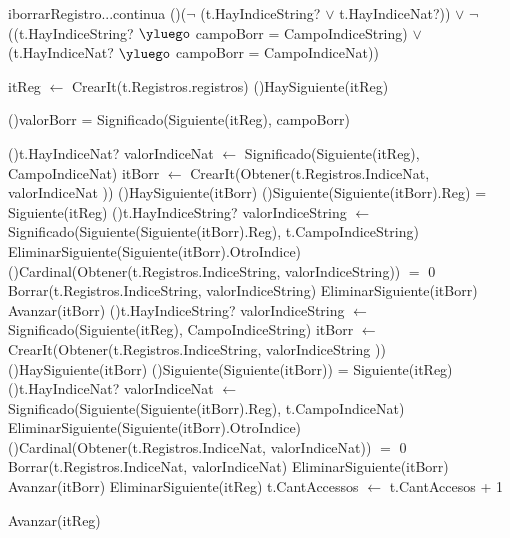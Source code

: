 \begin{Algoritmos}
\begin{algoritmo}{iborrarRegistro}{...continua}{}
    \If(){($\neg$ (t.HayIndiceString? $\vee$ t.HayIndiceNat?)) $\vee$ $\neg$ ((t.HayIndiceString? $\yluego$ campoBorr = CampoIndiceString) $\vee$ (t.HayIndiceNat? $\yluego$ campoBorr = CampoIndiceNat))}{
    itReg $\leftarrow$ CrearIt(t.Registros.registros) 
    \While(){HaySiguiente(itReg)}{
    	\If(){valorBorr = Significado(Siguiente(itReg), campoBorr)}{
        \If(){t.HayIndiceNat?}{
        valorIndiceNat $\gets$ Significado(Siguiente(itReg), CampoIndiceNat) 
        itBorr $\leftarrow$ CrearIt(Obtener(t.Registros.IndiceNat, valorIndiceNat )) 
        \While(){HaySiguiente(itBorr)}{
        \If(){Siguiente(Siguiente(itBorr).Reg) = Siguiente(itReg)}{
			\If(){t.HayIndiceString?}{
				valorIndiceString $\gets$ Significado(Siguiente(Siguiente(itBorr).Reg), t.CampoIndiceString) 
				EliminarSiguiente(Siguiente(itBorr).OtroIndice) 
				\If(){Cardinal(Obtener(t.Registros.IndiceString, valorIndiceString)) $=$ 0}{
                	Borrar(t.Registros.IndiceString, valorIndiceString)
               	}
            }
            EliminarSiguiente(itBorr) 
        }
        Avanzar(itBorr) 
        }
        }
        \If(){t.HayIndiceString?}{
        valorIndiceString $\gets$ Significado(Siguiente(itReg), CampoIndiceString) 
        itBorr $\leftarrow$ CrearIt(Obtener(t.Registros.IndiceString, valorIndiceString )) 
        \While(){HaySiguiente(itBorr)}{
        \If(){Siguiente(Siguiente(itBorr)) = Siguiente(itReg)}{
			\If(){t.HayIndiceNat?}{
				valorIndiceNat $\gets$ Significado(Siguiente(Siguiente(itBorr).Reg), t.CampoIndiceNat) 
				EliminarSiguiente(Siguiente(itBorr).OtroIndice) 
				\If(){Cardinal(Obtener(t.Registros.IndiceNat, valorIndiceNat)) $=$ 0}{
                	Borrar(t.Registros.IndiceNat, valorIndiceNat)
               	}
            }
        	EliminarSiguiente(itBorr) 
        }
        Avanzar(itBorr) 
        }
        }
        EliminarSiguiente(itReg) 
        t.CantAccessos $\leftarrow$ t.CantAccesos + 1 
        
        }
        Avanzar(itReg) 
    }    
}     
\end{algoritmo}


\end{Algoritmos}
